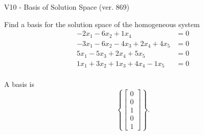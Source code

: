 \begin{exercise}
  \begin{exerciseTitle}V10 - Basis of Solution Space (ver. 869)\end{exerciseTitle}
  \begin{exerciseStatement}
    Find a basis for the solution space of the homogeneous system 
\begin{align*}
 -2 x_ 1 -6 x_ 2 + 1 x_ 4 &= 0  \\ 
  -3 x_ 1 -6 x_ 2 -4 x_ 3 + 2 x_ 4 + 4 x_ 5 &= 0  \\ 
  5 x_ 1 -5 x_ 3 + 2 x_ 4 + 5 x_ 5 &= 0  \\ 
  1 x_ 1 + 3 x_ 2 + 1 x_ 3 + 4 x_ 4 -1 x_ 5 &= 0  \\ 
 \end{align*}


 
  \end{exerciseStatement}

  \begin{exerciseAnswer}
   A basis is   
\[\left\{\left[\begin{array}{c}
0 \\
0 \\
1 \\
0 \\
1
\end{array}\right]\right\}.\]

  


  \end{exerciseAnswer}
\end{exercise}